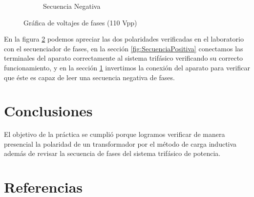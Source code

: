 \documentclass[]{article}
\begin{document}
\begin{figure}[h!]
\begin{subfigure}[b]{0.3\textwidth}
			
			\caption{Secuencia Negativa}
			\label{fig:SecuenciaNegativa}
			
		\end{subfigure}
		\caption{Gráfica de voltajes de fases (110 Vpp)}\label{fig:SecuenciaDeFases}
	\end{figure}
	
	En la figura \ref{fig:SecuenciaDeFases} podemos apreciar las dos polaridades verificadas en el laboratorio con el secuenciador de fases, en la sección \ref{fig:SecuenciaPositiva} conectamos las terminales del aparato correctamente al sistema trifásico verificando su correcto funcionamiento, y en la sección \ref{fig:SecuenciaNegativa} invertimos la conexión del aparato para verificar que éste es capaz de leer una secuencia negativa de fases.\\
	






    
	
	\section{Conclusiones}
	
	El objetivo de la práctica se cumplió porque logramos verificar de manera presencial la polaridad de un transformador por el método de carga inductiva además de revisar la secuencia de fases del sistema trifásico de potencia.

	\section{Referencias}
	

	
    
    


	
	
\end{document}
